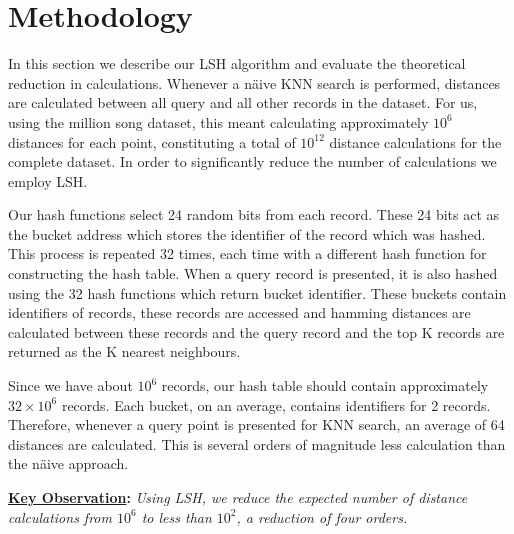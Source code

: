 \section{Methodology}
\label{sec:methodology}
In this section we describe our LSH algorithm and evaluate the theoretical reduction in calculations. 
Whenever a n\"{a}ive KNN search is performed, distances are calculated between all query and all other records in the dataset. 
For us, using the million song dataset, this meant calculating approximately $10^{6}$ distances for each point, constituting a total of $10^{12}$ distance calculations for the complete dataset. 
In order to significantly reduce the number of calculations we employ LSH. 

Our hash functions select 24 random bits from each record. 
These 24 bits act as the bucket address which stores the identifier of the record which was hashed. 
This process is repeated 32 times, each time with a different hash function for constructing the hash table. 
When a query record is presented, it is also hashed using the 32 hash functions which return bucket identifier. 
These buckets contain identifiers of records, these records are accessed and hamming distances are calculated between these records and the query record and the top K records are returned as the K nearest neighbours. 

Since we have about $10^{6}$ records, our hash table should contain approximately $32 \times 10^6$ records. Each bucket, on an average, contains identifiers for 2 records. Therefore, whenever a query point is presented for KNN search, an average of 64 distances are calculated. This is several orders of magnitude less calculation than the n\"{a}ive approach.

\textbf{\underline{Key Observation}:} \textit{Using LSH, we reduce the expected number of distance calculations from $10^6$ to less than $10^2$, a reduction of four orders.}